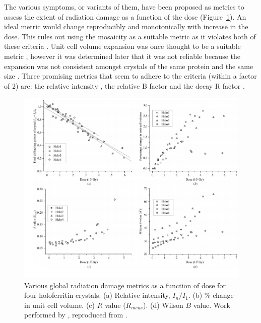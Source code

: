         The various symptoms, or variants of them, have been proposed as metrics to assess the extent of radiation damage as a function of the dose (Figure~\ref{fig:Radiation damage metrics}).
        An ideal metric would change reproducibly and monotonically with increase in the dose.
        This rules out using the mosaicity as a suitable metric as it violates both of these criteria \cite{garman2010}.
        Unit cell volume expansion was once thought to be a suitable metric \cite{ravelli2002}, however it was determined later that it was not reliable because the expansion was not consistent amongst crystals of the same protein and the same size \cite{murray2002}.
        Three promising metrics that seem to adhere to the criteria (within a factor of 2) are: the relative intensity \cite{owen2006}, the relative B factor \cite{kmetko2006} and the decay R factor \cite{diederichs2006}.

        \begin{figure}
            \centering
            \includegraphics[width=1.0\textwidth]{figures/introduction/raddammetrics.png}
            \caption[Global radiation damage metrics]{Various global radiation damage metrics as a function of dose for four holoferritin crystals.
            (a) Relative intensity, $I_n/I_1$.
            (b) \% change in unit cell volume.
            (c) $R$ value ($R_{meas}$).
            (d) Wilson $B$ value.
            Work performed by \cite{owen2006}, reproduced from \cite{garman2010}.}
            \label{fig:Radiation damage metrics}
        \end{figure}

